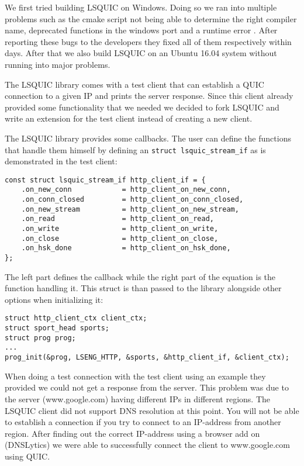 We first tried building LSQUIC on Windows. Doing so we ran into multiple problems such as the cmake script not being able to determine the right compiler name, deprecated functions in the windows port \cite{Link:LSQUICissue10} and a runtime error \cite{Link:LSQUICissue13}. 
After reporting these bugs to the developers they fixed all of them respectively within days.
After that we also build LSQUIC on an Ubuntu 16.04 system without running into major problems.

The LSQUIC library comes with a test client that can establish a QUIC connection to a given IP and prints the server response.
Since this client already provided some functionality that we needed we decided to fork LSQUIC and write an extension for the test client instead of creating a new client.

The LSQUIC library provides some callbacks. 
The user can define the functions that handle them himself by defining an \verb|struct lsquic_stream_if| as is demonstrated in the test client:
\begin{lstlisting}
const struct lsquic_stream_if http_client_if = {
    .on_new_conn            = http_client_on_new_conn,
    .on_conn_closed         = http_client_on_conn_closed,
    .on_new_stream          = http_client_on_new_stream,
    .on_read                = http_client_on_read,
    .on_write               = http_client_on_write,
    .on_close               = http_client_on_close,
    .on_hsk_done            = http_client_on_hsk_done,
};
\end{lstlisting}
The left part defines the callback while the right part of the equation is the function handling it.
This struct is than passed to the library alongside other options when initializing it:

\begin{lstlisting}
struct http_client_ctx client_ctx;
struct sport_head sports;
struct prog prog;
...
prog_init(&prog, LSENG_HTTP, &sports, &http_client_if, &client_ctx);
\end{lstlisting}

When doing a test connection with the test client using an example they provided we could not get a response from the server. This problem was due to the server (www.google.com) having different IPs in different regions. The LSQUIC client did not support DNS resolution at this point. You will not be able to establish a connection if you try to connect to an IP-address from another region. After finding out the correct IP-address using a browser add on (DNSLytics) we were able to successfully connect the client to www.google.com using QUIC.

